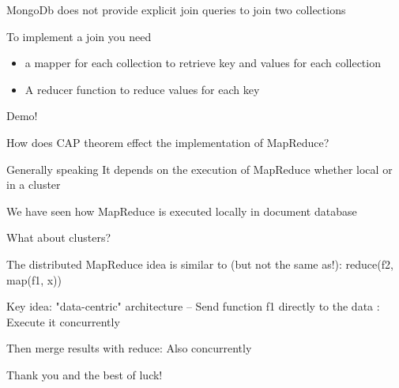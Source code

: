 \documentclass{beamer}
\begin{document}
\begin{slide}{
\item MongoDb does not provide explicit join queries to join two collections
\item To implement a join you need 
\begin{itemize}
\item  a mapper for each collection to retrieve key and values for each collection 
\item A reducer function to reduce values for each key
\end{itemize}
\item Demo! 
}\end{slide}

\begin{slide}{
\item How does CAP theorem effect the implementation of MapReduce?
\item Generally speaking It depends on the execution of MapReduce whether local or in a cluster 
\item We have seen how MapReduce is executed locally in document database 
\item What about clusters?
}\end{slide}

\begin{slide}{
\item The distributed MapReduce idea is similar to (but not the same as!): reduce(f2, map(f1, x))
\item Key idea: "data-centric" architecture –  Send function f1 directly to the data : Execute it concurrently
\item Then merge results with reduce: Also concurrently
}\end{slide}

\begin{slide}{
\item Thank you and the best of luck!
}\end{slide}
\end{document}

